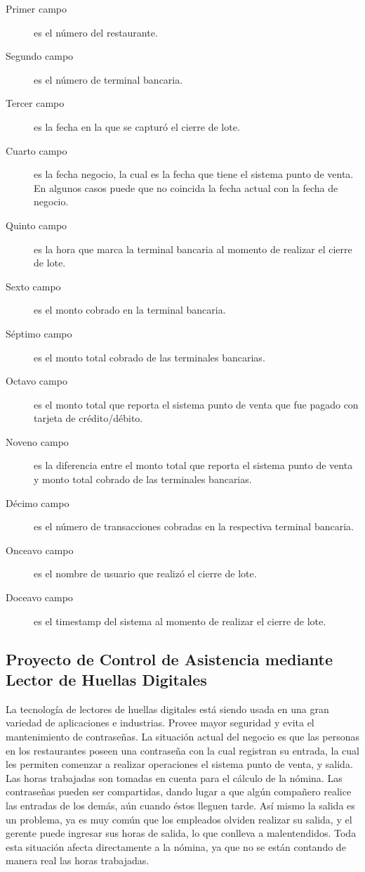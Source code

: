 \begin{description}
 \item[Primer campo] es el número del restaurante.
 \item[Segundo campo] es el número de terminal bancaria.
 \item[Tercer campo] es la fecha en la que se capturó el cierre de lote.
 \item[Cuarto campo] es la fecha negocio, la cual es la fecha que tiene el sistema punto de venta. En algunos casos puede que no coincida la fecha actual con la fecha de negocio.
 \item[Quinto campo] es la hora que marca la terminal bancaria al momento de realizar el cierre de lote.
 \item[Sexto campo] es el monto cobrado en la terminal bancaria.
 \item[Séptimo campo] es el monto total cobrado de las terminales bancarias.
 \item[Octavo campo] es el monto total que reporta el sistema punto de venta que fue pagado con tarjeta de crédito/débito.
 \item[Noveno campo] es la diferencia entre el monto total que reporta el sistema punto de venta y monto total cobrado de las terminales bancarias.
 \item[Décimo campo] es el número de transacciones cobradas en la respectiva terminal bancaria.
 \item[Onceavo campo] es el nombre de usuario que realizó el cierre de lote.
 \item[Doceavo campo] es el timestamp del sistema al momento de realizar el cierre de lote.
\end{description}


\subsection{Proyecto de Control de Asistencia mediante Lector de Huellas Digitales}
\label{sec:fingerprint}

La tecnología de lectores de huellas digitales está siendo usada en una gran variedad de aplicaciones e industrias. Provee mayor seguridad y evita el mantenimiento de contraseñas. La situación actual del negocio es que las personas en los restaurantes poseen una contraseña con la cual registran su entrada, la cual les permiten comenzar a realizar operaciones el sistema punto de venta,  y salida. Las horas trabajadas son tomadas en cuenta para el cálculo de la nómina. Las contraseñas pueden ser compartidas, dando lugar a que algún compañero realice las entradas de los demás, aún cuando éstos lleguen tarde. Así mismo la salida es un problema, ya es muy común que los empleados olviden realizar su salida, y el gerente puede ingresar sus horas de salida, lo que conlleva a malentendidos. Toda esta situación afecta directamente a la nómina, ya que no se están contando de manera real las horas trabajadas.

